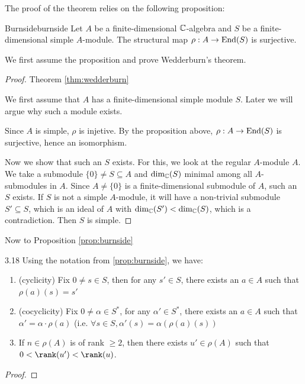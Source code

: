 \documentclass[twoside = false,	%
		headsepline,		%
		parskip = true,
		]{scrbook}						%
\begin{document}
    The proof of the theorem relies on the following proposition:

    \begin{proposition}{Burnside}{burnside}
        Let $A$ be a finite-dimensional $\mathbb C$-algebra and $S$ be a finite-dimensional simple $A$-module. The structural map $\rho: A \to \mathrm{End}(S)$ is surjective.
    \end{proposition}

    We first assume the proposition and prove Wedderburn's theorem.

    \begin{proof}
        Theorem \ref{thm:wedderburn}

        We first assume that $A$ has a finite-dimensional simple module $S$. Later we will argue why such a module exists.
        
        Since $A$ is simple, $\rho$ is injetive. By the proposition above, $\rho: A \to \mathrm{End}(S)$ is surjective, hence an isomorphism.

        Now we show that such an $S$ exists. For this, we look at the regular $A$-module $A$. We take a submodule $\{0\} \neq S \subseteq A$ and $\dim_\mathbb C(S)$ minimal among all $A$-submodules in $A$. Since $A \neq \{0\}$ is a finite-dimensional submodule of $A$, such an $S$ exists. If $S$ is not a simple $A$-module, it will have a non-trivial submodule $S' \subseteq S$, which is an ideal of $A$ with $\dim_\mathbb C(S') < \dim_\mathbb C(S)$, which is a contradiction. Then $S$ is simple.
    \end{proof}

    Now to Proposition \ref{prop:burnside}

    \begin{lemma}{}{3.18}
        Using the notation from \ref{prop:burnside}, we have:
        \begin{enumerate}
            \item (cyclicity) Fix $0 \neq s \in S$, then for any $s' \in S$, there exists an $a \in A$ such that $\rho(a)(s) = s'$
            \item (cocyclicity) Fix $0 \neq \alpha \in S^*$, for any $\alpha' \in S^*$, there exists an $a \in A$ such that $\alpha' = \alpha \cdot \rho(a)$ (i.e. $\forall s \in S, \alpha'(s) = \alpha(\rho(a)(s))$
            \item If $n \in \rho(A)$ is of rank $\geq 2$, then there exists $u' \in \rho(A)$ such that $0 < \rank(u') < \rank(u)$.
        \end{enumerate}
    \end{lemma}

    \begin{proof}
        
    \end{proof}

    



    

\printbibliography
\end{document}
